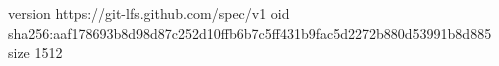 version https://git-lfs.github.com/spec/v1
oid sha256:aaf178693b8d98d87c252d10ffb6b7c5ff431b9fac5d2272b880d53991b8d885
size 1512
